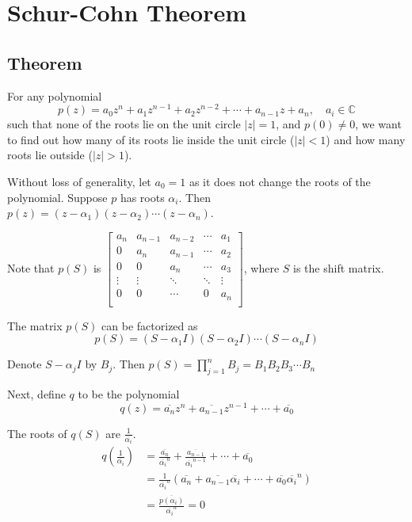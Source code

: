 \documentclass[twoside]{article}
\newcommand*\conj[1]{\overline{#1}}
\theoremstyle{plain}
\theoremstyle{definition}
\theoremstyle{remark}
\begin{document}
\section{Schur-Cohn Theorem}

\subsection{Theorem}
For any polynomial \[p(z) = a_0 z^n + a_1z^{n-1} + a_2 z^{n-2} + \cdots +  a_{n-1} z + a_n, \quad a_i \in \mathbb{C}\]  such that none of the roots lie on the unit circle \(|z| = 1\),  and \(p(0) \ne 0\), we want to find out how many of its roots lie inside the unit circle (\(|z| < 1\))  and how many roots lie outside (\(|z| > 1\)).

 Without loss of generality, let \(a_0 = 1\) as it does not change the roots of the polynomial. Suppose \(p\) has roots \(\alpha_i\). Then \(p(z) = (z - \alpha_1) (z - \alpha_2) \cdots (z - \alpha_n)\). 

Note that \(p(S) \) is \( \begin{bmatrix} 

a_n & a_{n-1} & a_{n-2} & \cdots & a_1 \\
0 & a_n & a_{n-1} & \cdots & a_2 \\
0 & 0 & a_n & \cdots & a_3 \\
\vdots & \vdots & \ddots &\ddots & \vdots \\
0 & 0 & \cdots & 0 & a_n \\ 
\end{bmatrix}\), where \(S\) is the shift matrix. 


The matrix \(p(S)\) can be factorized as \[p(S) = (S - \alpha_1I) (S - \alpha_2 I) \cdots (S - \alpha_n I)\]

Denote \(S - \alpha_jI\) by \(B_j\). Then \(p(S) =\displaystyle \prod_{j=1}^n B_j = B_1 B_2 B_3 \cdots B_n\)

Next, define \(q\) to be the polynomial 
\[q(z) = \conj{a_n}z^n + \conj{a_{n-1}}z^{n-1} + \cdots + \conj{a_0}\] 

The roots of \(q(S)\) are \(\frac {1}{\conj{\alpha_i}}\). 
\begin{equation*}\begin{split}
q \left(\frac{1}{\conj{\alpha_i}} \right) & = \frac{\conj{a_n}}{\conj{\alpha_i}^n} + \frac{\conj{a_{n-1}}}{\conj{\alpha_i}^{n-1}} + \cdots + \conj{a_0} \\
& = \frac{1}{\conj{\alpha_i}^n} (\conj{a_n} + \conj{a_{n-1}} \conj{\alpha_i} + \cdots + \conj{a_0} \conj{\alpha_i}^n) \\
& = \frac{\conj{p(\alpha_i)}}{\conj{\alpha_i}^n} = 0
\end{split}\end{equation*}
\end{document}
